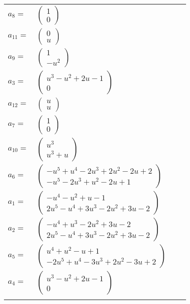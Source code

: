 \documentclass[1p]{elsarticle_modified}
\theoremstyle{definition}
\begin{document}
\begin{tabular}{m{7pt} m{180pt} m{7pt} m{180pt} }
\flushright $a_{8}=$&$\begin{pmatrix}1\\0\end{pmatrix}$ \\
\flushright $a_{11}=$&$\begin{pmatrix}0\\u\end{pmatrix}$ \\
\flushright $a_{9}=$&$\begin{pmatrix}1\\- u^2\end{pmatrix}$ \\
\flushright $a_{3}=$&$\begin{pmatrix}u^3- u^2+2 u-1\\0\end{pmatrix}$ \\
\flushright $a_{12}=$&$\begin{pmatrix}u\\u\end{pmatrix}$ \\
\flushright $a_{7}=$&$\begin{pmatrix}1\\0\end{pmatrix}$ \\
\flushright $a_{10}=$&$\begin{pmatrix}u^3\\u^3+u\end{pmatrix}$ \\
\flushright $a_{6}=$&$\begin{pmatrix}- u^5+u^4-2 u^3+2 u^2-2 u+2\\- u^5-2 u^3+u^2-2 u+1\end{pmatrix}$ \\
\flushright $a_{1}=$&$\begin{pmatrix}- u^4- u^2+u-1\\2 u^5- u^4+3 u^3-2 u^2+3 u-2\end{pmatrix}$ \\
\flushright $a_{2}=$&$\begin{pmatrix}- u^4+u^3-2 u^2+3 u-2\\2 u^5- u^4+3 u^3-2 u^2+3 u-2\end{pmatrix}$ \\
\flushright $a_{5}=$&$\begin{pmatrix}u^4+u^2- u+1\\-2 u^5+u^4-3 u^3+2 u^2-3 u+2\end{pmatrix}$ \\
\flushright $a_{4}=$&$\begin{pmatrix}u^3- u^2+2 u-1\\0\end{pmatrix}$\\&\end{tabular}
\end{document}
